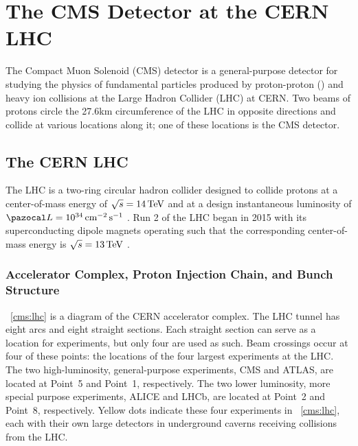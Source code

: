 \chapter{The CMS Detector at the CERN LHC}
\label{chap:cms}

The Compact Muon Solenoid (CMS) detector is a general-purpose detector for studying the physics of fundamental particles produced by proton-proton (\pp) and heavy ion collisions at the Large Hadron Collider (LHC) at CERN.
Two beams of protons circle the 27.6\unit{km} circumference of the LHC in opposite directions and collide at various locations along it; one of these locations is the CMS detector.

\section{The CERN LHC}
The LHC is a two-ring circular hadron collider designed to collide protons at a center-of-mass energy of $\sqrt{s} = 14\,\text{Te\hspace{-.08em}V}$ and at a design instantaneous luminosity of $\lumi = 10^{34} \cm^{-2} \unit{s}^{-1}$ \cite{Evans:2008zzb}.
Run 2 of the LHC began in 2015 with its superconducting dipole magnets operating such that the corresponding center-of-mass energy is $\sqrt{s} = 13\,\text{Te\hspace{-.08em}V}$ \cite{Todesco:2017tcj}.

\subsection{Accelerator Complex, Proton Injection Chain, and Bunch Structure}
\Fig~\ref{cms:lhc} is a diagram of the CERN accelerator complex.
The LHC tunnel has eight arcs and eight straight sections.
Each straight section can serve as a location for experiments, but only four are used as such.
Beam crossings occur at four of these points: the locations of the four largest experiments at the LHC.
The two high-luminosity, general-purpose experiments, CMS and ATLAS, are located at Point~5 and Point~1, respectively.
The two lower luminosity, more special purpose experiments, ALICE and LHCb, are located at Point~2 and Point~8, respectively.
Yellow dots indicate these four experiments in \Fig~\ref{cms:lhc}, each with their own large detectors in underground caverns receiving collisions from the LHC.

